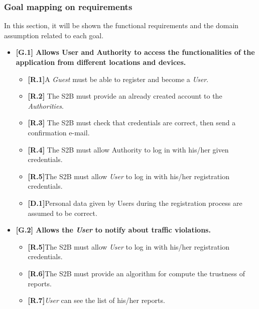 \subsubsection{Goal mapping on requirements}






In this section, it will be shown the functional requirements and the domain assumption related to each goal.
\begin{itemize}


\item \textbf{{[G.1]} Allows User and Authority to access the functionalities of the application from different locations and devices.}
\begin{itemize}
    \item \textbf{[R.1]}A \textit{Guest} must be able to register and become a \textit{User}.
    
     \item \textbf{[R.2]} The S2B must provide an already created account to the \textit{Authorities}.
    
    \item \textbf{[R.3]} The S2B must check that credentials are correct, then send a confirmation e-mail.
    
    \item \textbf{[R.4]} The S2B must allow Authority to log in with his/her given credentials.
    
     
      \item \textbf{[R.5]}The S2B must allow \textit{User} to log in with his/her registration credentials.
      
       \item \textbf{[D.1]}Personal data given by Users during the registration process are assumed to be correct.
\end{itemize}

\item \textbf{{[G.2]} Allows the \textit{User} to notify about traffic violations.}
\begin{itemize}
        \item \textbf{[R.5]}The S2B must allow \textit{User} to log in with his/her registration credentials.
        
        \item \textbf{[R.6]}The S2B must provide an algorithm for compute the trustness of reports.
        
        \item \textbf{[R.7]}\textit{User} can see the list of his/her reports.
        

\end{itemize}
\end{itemize}
